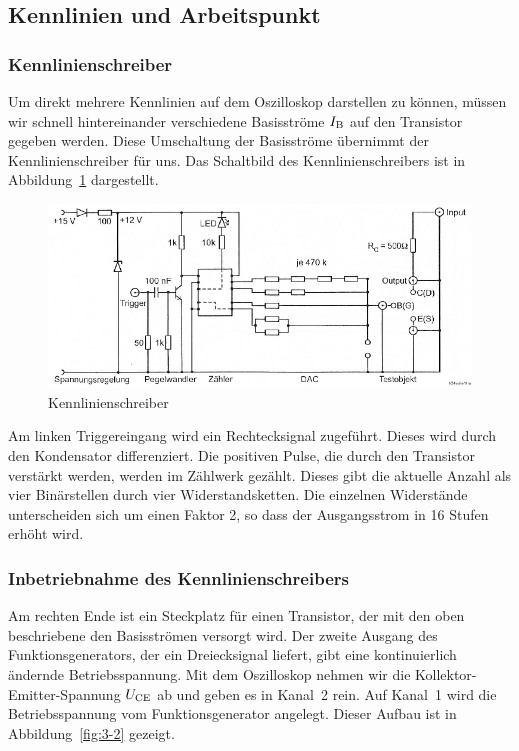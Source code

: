 \FloatBarrier
\subsection{Kennlinien und Arbeitspunkt}

\subsubsection{Kennlinienschreiber}

Um direkt mehrere Kennlinien auf dem Oszilloskop darstellen zu können, müssen
wir schnell hintereinander verschiedene Basisströme $I_\text{B}$ auf den Transistor
gegeben werden. Diese Umschaltung der Basisströme übernimmt der
Kennlinienschreiber für uns. Das Schaltbild des Kennlinienschreibers ist in
Abbildung~\ref{fig:3-1} dargestellt.

\begin{figure}[htbp]
	\centering
	\includegraphics[width=\textwidth]{Anleitung/3-1.png}
	\caption{
		Kennlinienschreiber \cite[Abbildung~3.1]{physik313-Anleitung}
	}
	\label{fig:3-1}
\end{figure}

Am linken Triggereingang wird ein
Rechtecksignal zugeführt. Dieses wird durch den Kondensator differenziert. Die
positiven Pulse, die durch den Transistor verstärkt werden, werden im Zählwerk
gezählt. Dieses gibt die aktuelle Anzahl als vier Binärstellen durch vier
Widerstandsketten. Die einzelnen Widerstände unterscheiden sich um einen Faktor
2, so dass der Ausgangsstrom in 16 Stufen erhöht wird.

\subsubsection{Inbetriebnahme des Kennlinienschreibers}

Am rechten Ende ist ein Steckplatz für einen Transistor, der mit den oben
beschriebene den Basisströmen versorgt wird. Der zweite Ausgang des
Funktionsgenerators, der ein Dreiecksignal liefert, gibt eine kontinuierlich
ändernde Betriebsspannung. Mit dem Oszilloskop nehmen wir die
Kollektor-Emitter-Spannung $U_\text{CE}$ ab und geben es in Kanal~2 rein. Auf Kanal~1
wird die Betriebsspannung vom Funktionsgenerator angelegt. Dieser Aufbau ist in
Abbildung~\ref{fig:3-2} gezeigt.

